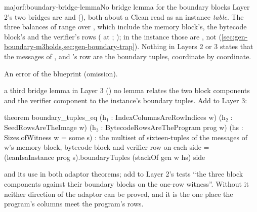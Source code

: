 \begin{finding}{major}{f:boundary-bridge-lemma}{No bridge lemma for the boundary blocks}
 Layer 2's two bridges are  and
 (), both about a Clean  read as an instance
\emph{table}. The three balances of  range over , which
include the memory block's, the bytecode block's and the verifier's rows
( at ; ); in
the instance those are , not 
(\cref{sec:gen-boundary-m3holds,sec:gen-boundary-trap}). Nothing in Layers 2 or 3 states that the
messages of ,  and 's
row are the boundary tuples, coordinate by coordinate.

 An error of the blueprint (omission).

\begin{change}{a third bridge lemma in Layer 3 ()}
\asis no lemma relates the two block components and the verifier component to the instance's
boundary tuples.
\asproposed Add to Layer 3:
\begin{leancode}
theorem boundary_tuples_eq (h₁ : IndexColumnsAreRowIndices w) (h₂ : SeedRowsAreTheImage w)
    (h₃ : BytecodeRowsAreTheProgram prog w) (hs : Sizes.ofWitness w = some s) :
    the multiset of sixteen-tuples of the messages of w's memory block, bytecode block and
    verifier row on each side = (leanIsaInstance prog s).boundaryTuples (stackOf gen w hs) side
\end{leancode}
and its use in both adaptor theorems; add to Layer 2's tests \enquote{the three block components
against their boundary blocks on the one-row witness}.
\reason Without it neither direction of the adaptor can be proved, and it is the one place the
program's  columns meet the program's rows.
\end{change}
\end{finding}

